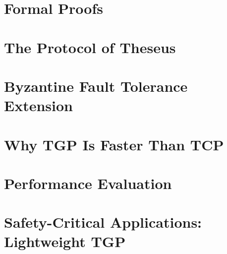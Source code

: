 \documentclass[11pt,a4paper]{article}
\begin{document}


\section{Formal Proofs}
\label{sec:proofs}



\section{The Protocol of Theseus}
\label{sec:theseus}



\section{Byzantine Fault Tolerance Extension}
\label{sec:bft}



\section{Why TGP Is Faster Than TCP}
\label{sec:latency}



\section{Performance Evaluation}
\label{sec:evaluation}



\section{Safety-Critical Applications: Lightweight TGP}
\label{sec:safety-critical}
\end{document}
